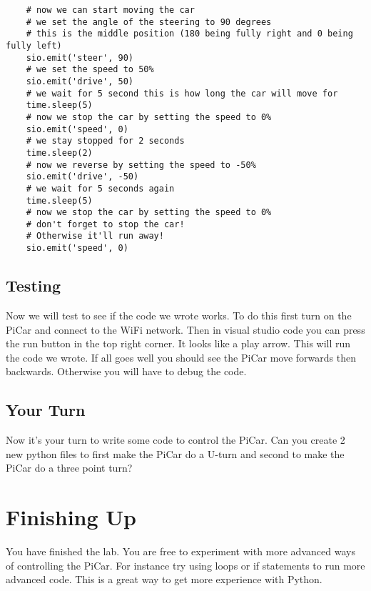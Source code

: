 \documentclass[11pt]{report}
\begin{document}
\begin{verbatim}
    # now we can start moving the car
    # we set the angle of the steering to 90 degrees
    # this is the middle position (180 being fully right and 0 being fully left)
    sio.emit('steer', 90)
    # we set the speed to 50%
    sio.emit('drive', 50)
    # we wait for 5 second this is how long the car will move for
    time.sleep(5)
    # now we stop the car by setting the speed to 0%
    sio.emit('speed', 0)
    # we stay stopped for 2 seconds
    time.sleep(2)
    # now we reverse by setting the speed to -50%
    sio.emit('drive', -50)
    # we wait for 5 seconds again
    time.sleep(5)
    # now we stop the car by setting the speed to 0%
    # don't forget to stop the car!
    # Otherwise it'll run away!
    sio.emit('speed', 0)
    \end{verbatim}

\section{Testing}
Now we will test to see if the code we wrote works. To do this first turn on
the PiCar and connect to the WiFi network. Then in visual studio code you can
press the run button in the top right corner. It looks like a play arrow. This
will run the code we wrote. If all goes well you should see the PiCar move
forwards then backwards. Otherwise you will have to debug the code.

\section{Your Turn}

Now it's your turn to write some code to control the PiCar. Can you create 2
new python files to first make the PiCar do a U-turn and second to make the
PiCar do a three point turn?

\chapter{Finishing Up}
You have finished the lab. You are free to experiment with more advanced ways
of controlling the PiCar. For instance try using loops or if statements to run
more advanced code. This is a great way to get more experience with Python.
\end{document}
